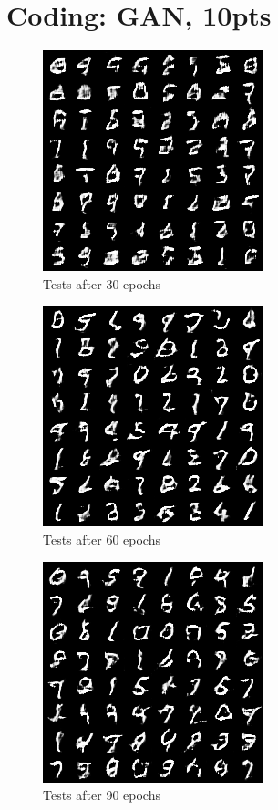 \documentclass[12pt]{article}
\begin{document}
\section{Coding: GAN, 10pts}
\begin{figure}[!ht]
    \centering
    \includegraphics{test_30}
    \caption{Tests after 30 epochs}
\end{figure}
\begin{figure}[!ht]
    \centering
    \includegraphics{test_60}
    \caption{Tests after 60 epochs}
\end{figure}
\begin{figure}[!ht]
    \centering
    \includegraphics{test_90}
    \caption{Tests after 90 epochs}
\end{figure}
\newpage
\end{document}
